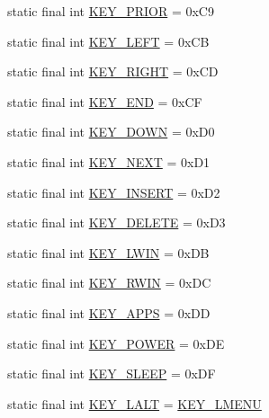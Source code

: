 \begin{DoxyCompactItemize}
\item 
static final int \mbox{\hyperlink{classorg_1_1newdawn_1_1slick_1_1_input_a3539a53d0388b57a186394cdc39c8740}{K\+E\+Y\+\_\+\+P\+R\+I\+OR}} = 0x\+C9
\item 
static final int \mbox{\hyperlink{classorg_1_1newdawn_1_1slick_1_1_input_a366d699b082b4a7c2056035954383b74}{K\+E\+Y\+\_\+\+L\+E\+FT}} = 0x\+CB
\item 
static final int \mbox{\hyperlink{classorg_1_1newdawn_1_1slick_1_1_input_a6b75d25526d739570423da1788958fc5}{K\+E\+Y\+\_\+\+R\+I\+G\+HT}} = 0x\+CD
\item 
static final int \mbox{\hyperlink{classorg_1_1newdawn_1_1slick_1_1_input_af59a5eb7b0b8c893b25e93eeab3f647b}{K\+E\+Y\+\_\+\+E\+ND}} = 0x\+CF
\item 
static final int \mbox{\hyperlink{classorg_1_1newdawn_1_1slick_1_1_input_a7bb0baeee8aa377ece7512147e8f4b99}{K\+E\+Y\+\_\+\+D\+O\+WN}} = 0x\+D0
\item 
static final int \mbox{\hyperlink{classorg_1_1newdawn_1_1slick_1_1_input_aedeb82160a1553d79a59df7ab973061f}{K\+E\+Y\+\_\+\+N\+E\+XT}} = 0x\+D1
\item 
static final int \mbox{\hyperlink{classorg_1_1newdawn_1_1slick_1_1_input_a705bfa83169894ca41f3efe1dfe56b3e}{K\+E\+Y\+\_\+\+I\+N\+S\+E\+RT}} = 0x\+D2
\item 
static final int \mbox{\hyperlink{classorg_1_1newdawn_1_1slick_1_1_input_ab1813cecec8757f27d504b8b78e150ff}{K\+E\+Y\+\_\+\+D\+E\+L\+E\+TE}} = 0x\+D3
\item 
static final int \mbox{\hyperlink{classorg_1_1newdawn_1_1slick_1_1_input_a4ef8f7b54d49095f863235908fabfd01}{K\+E\+Y\+\_\+\+L\+W\+IN}} = 0x\+DB
\item 
static final int \mbox{\hyperlink{classorg_1_1newdawn_1_1slick_1_1_input_ae1e7877dee90dc66baab605b1ee8c823}{K\+E\+Y\+\_\+\+R\+W\+IN}} = 0x\+DC
\item 
static final int \mbox{\hyperlink{classorg_1_1newdawn_1_1slick_1_1_input_a4e86880ee87706ab98e6b96efd52cfc0}{K\+E\+Y\+\_\+\+A\+P\+PS}} = 0x\+DD
\item 
static final int \mbox{\hyperlink{classorg_1_1newdawn_1_1slick_1_1_input_a0c870bad68309d9a7f6d197000f3e0bb}{K\+E\+Y\+\_\+\+P\+O\+W\+ER}} = 0x\+DE
\item 
static final int \mbox{\hyperlink{classorg_1_1newdawn_1_1slick_1_1_input_ac0f50de4059d4795079f5afd2e107670}{K\+E\+Y\+\_\+\+S\+L\+E\+EP}} = 0x\+DF
\item 
static final int \mbox{\hyperlink{classorg_1_1newdawn_1_1slick_1_1_input_a9018327d5ce013aa9163e3ec4e22f836}{K\+E\+Y\+\_\+\+L\+A\+LT}} = \mbox{\hyperlink{classorg_1_1newdawn_1_1slick_1_1_input_a6cd7bb15c3b4ad8550978adb3da6ebc1}{K\+E\+Y\+\_\+\+L\+M\+E\+NU}}

\end{DoxyCompactItemize}
